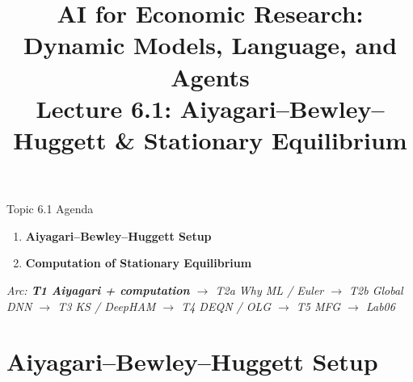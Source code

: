 


\graphicspath{{./pic/}{../../MiniCourse_8hr/Slides/Module2_DL_RL_Macro/pic/}{../}}

\title[AI for Econ Research]{AI for Economic Research: Dynamic Models, Language, and Agents\\
Lecture 6.1: Aiyagari--Bewley--Huggett \& Stationary Equilibrium}



\makebeamertitle

\begin{frame}{Topic 6.1 Agenda}
\begin{enumerate}
  \item \textbf{Aiyagari--Bewley--Huggett Setup}
  \medskip
  \item \textbf{Computation of Stationary Equilibrium}
\end{enumerate}
\medskip
\textit{Arc: \textbf{T1 Aiyagari + computation} $\to$ T2a Why ML / Euler $\to$ T2b Global DNN $\to$ T3 KS / DeepHAM $\to$ T4 DEQN / OLG $\to$ T5 MFG $\to$ Lab06}
\end{frame}

\section{Aiyagari--Bewley--Huggett Setup}

